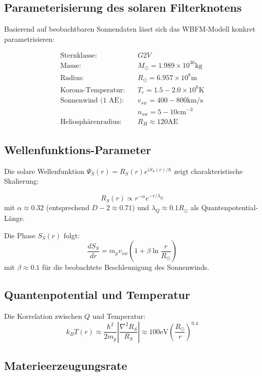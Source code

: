 \subsection{Parameterisierung des solaren Filterknotens}

Basierend auf beobachtbaren Sonnendaten lässt sich das WBFM-Modell konkret parametrisieren:

\begin{align*}
\text{Sternklasse:} &\quad G2V \\
\text{Masse:} &\quad M_\odot = 1.989 \times 10^{30}  \text{kg} \\
\text{Radius:} &\quad R_\odot = 6.957 \times 10^8  \text{m} \\
\text{Korona-Temperatur:} &\quad T_c = 1.5-2.0 \times 10^6  \text{K} \\
\text{Sonnenwind (1 AE):} &\quad v_{sw} = 400-800  \text{km/s} \\
&\quad n_{sw} = 5-10  \text{cm}^{-3} \\
\text{Heliosphärenradius:} &\quad R_H \approx 120  \text{AE}
\end{align*}

\subsection{Wellenfunktions-Parameter}

Die solare Wellenfunktion $\Psi_S(r) = R_S(r)e^{iS_S(r)/\hbar}$ zeigt charakteristische Skalierung:

\[
R_S(r) \propto r^{-\alpha} e^{-r/\lambda_Q}
\]
mit $\alpha \approx 0.32$ (entsprechend $D-2 \approx 0.71$) und $\lambda_Q \approx 0.1 R_\odot$ als Quantenpotential-Länge.

Die Phase $S_S(r)$ folgt:
\[
\frac{dS_S}{dr} = m_p v_{sw} \left(1 + \beta \ln\frac{r}{R_\odot}\right)
\]
mit $\beta \approx 0.1$ für die beobachtete Beschleunigung des Sonnenwinds.

\subsection{Quantenpotential und Temperatur}

Die Korrelation zwischen $Q$ und Temperatur:
\[
k_B T(r) \approx \frac{\hbar^2}{2m_p} \left|\frac{\nabla^2 R_S}{R_S}\right| \approx 100  \text{eV} \left(\frac{R_\odot}{r}\right)^{0.4}
\]

\subsection{Materieerzeugungsrate}

